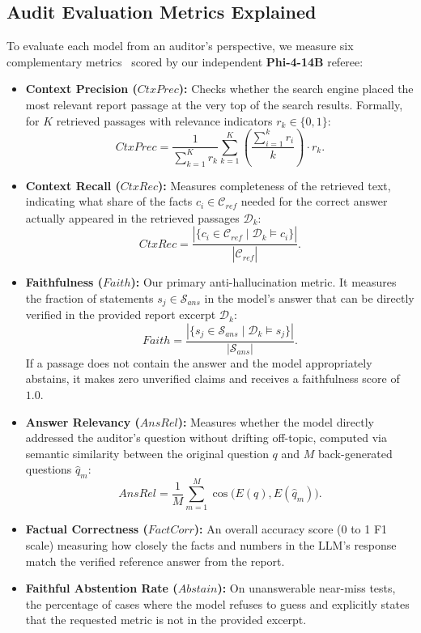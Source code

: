 \documentclass[11pt,letterpaper]{article}
\newcommand{\model}[1]{\textbf{#1}}
\newcommand{\mi}[1]{\mathit{#1}}
\begin{document}
\subsection{Audit Evaluation Metrics Explained}
To evaluate each model from an auditor's perspective, we measure six complementary metrics~\citep{es2024ragas,saad2026empirical} scored by our independent \model{Phi-4-14B} referee:
\begin{itemize}[leftmargin=1.5em, itemsep=2pt]
  \item \textbf{Context Precision ($\mi{CtxPrec}$):} Checks whether the search engine placed the most relevant report passage at the very top of the search results. Formally, for $K$ retrieved passages with relevance indicators $r_k \in \{0, 1\}$:
  \begin{equation}
    \mi{CtxPrec} = \frac{1}{\sum_{k=1}^K r_k} \sum_{k=1}^K \left( \frac{\sum_{i=1}^k r_i}{k} \right) \cdot r_k.
  \end{equation}
  \item \textbf{Context Recall ($\mi{CtxRec}$):} Measures completeness of the retrieved text, indicating what share of the facts $c_i \in \mathcal{C}_{\mi{ref}}$ needed for the correct answer actually appeared in the retrieved passages $\mathcal{D}_k$:
  \begin{equation}
    \mi{CtxRec} = \frac{|\{c_i \in \mathcal{C}_{\mi{ref}} \mid \mathcal{D}_k \models c_i\}|}{|\mathcal{C}_{\mi{ref}}|}.
  \end{equation}
  \item \textbf{Faithfulness ($\mi{Faith}$):} Our primary anti-hallucination metric. It measures the fraction of statements $s_j \in \mathcal{S}_{\mi{ans}}$ in the model's answer that can be directly verified in the provided report excerpt $\mathcal{D}_k$:
  \begin{equation}
    \mi{Faith} = \frac{|\{s_j \in \mathcal{S}_{\mi{ans}} \mid \mathcal{D}_k \models s_j\}|}{|\mathcal{S}_{\mi{ans}}|}.
  \end{equation}
  If a passage does not contain the answer and the model appropriately abstains, it makes zero unverified claims and receives a faithfulness score of $1.0$.
  \item \textbf{Answer Relevancy ($\mi{AnsRel}$):} Measures whether the model directly addressed the auditor's question without drifting off-topic, computed via semantic similarity between the original question $q$ and $M$ back-generated questions $\hat{q}_m$:
  \begin{equation}
    \mi{AnsRel} = \frac{1}{M} \sum_{m=1}^M \cos\big(E(q), E(\hat{q}_m)\big).
  \end{equation}
  \item \textbf{Factual Correctness ($\mi{FactCorr}$):} An overall accuracy score (0 to 1 F1 scale) measuring how closely the facts and numbers in the LLM's response match the verified reference answer from the report.
  \item \textbf{Faithful Abstention Rate ($\mi{Abstain}$):} On unanswerable near-miss tests, the percentage of cases where the model refuses to guess and explicitly states that the requested metric is not in the provided excerpt.
\end{itemize}
\end{document}
